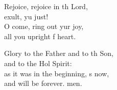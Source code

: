 \begin{psalmverse}
\begin{patverse}
Rejoice, rejoice in th Lord,\Med\\
exult, yu just!\\
O come, ring out yur joy,\Med\\
all you upright f heart.

Glory to the Father and to th Son,\Med\\
and to the Hol Spirit:\\
as it was in the beginning, \pointup{\i}s now,\Med\\
and will be forever. men. 
  \end{patverse}
\end{psalmverse}
